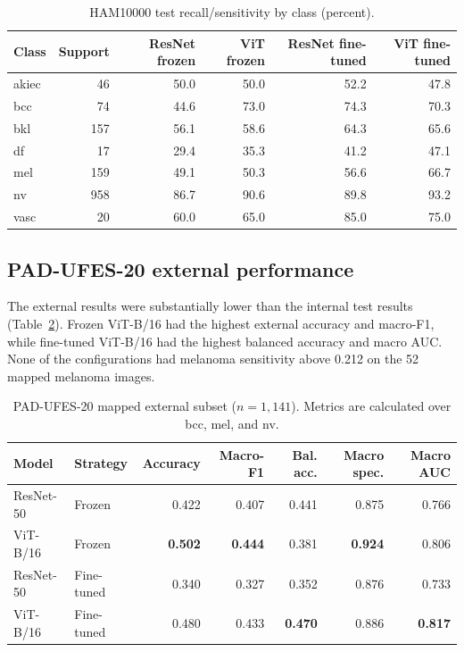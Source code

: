 \documentclass[11pt]{article}
\begin{document}
\begin{table}[H]
\centering
\small
\caption{HAM10000 test recall/sensitivity by class (percent).}
\label{tab:internal-recall}
\begin{tabular}{lrrrrr}
\toprule
Class & Support & ResNet frozen & ViT frozen & ResNet fine-tuned & ViT fine-tuned\\
\midrule
akiec & 46 & 50.0 & 50.0 & 52.2 & 47.8\\
bcc   & 74 & 44.6 & 73.0 & 74.3 & 70.3\\
bkl   & 157 & 56.1 & 58.6 & 64.3 & 65.6\\
df    & 17 & 29.4 & 35.3 & 41.2 & 47.1\\
mel   & 159 & 49.1 & 50.3 & 56.6 & 66.7\\
nv    & 958 & 86.7 & 90.6 & 89.8 & 93.2\\
vasc  & 20 & 60.0 & 65.0 & 85.0 & 75.0\\
\bottomrule
\end{tabular}
\end{table}

\subsection{PAD-UFES-20 external performance}

The external results were substantially lower than the internal test results (Table~\ref{tab:external}). Frozen ViT-B/16 had the highest external accuracy and macro-F1, while fine-tuned ViT-B/16 had the highest balanced accuracy and macro AUC. None of the configurations had melanoma sensitivity above 0.212 on the 52 mapped melanoma images.

\begin{table}[H]
\centering
\small
\caption{PAD-UFES-20 mapped external subset ($n=1,141$). Metrics are calculated over bcc, mel, and nv.}
\label{tab:external}
\begin{tabular}{llrrrrr}
\toprule
Model & Strategy & Accuracy & Macro-F1 & Bal. acc. & Macro spec. & Macro AUC\\
\midrule
ResNet-50 & Frozen & 0.422 & 0.407 & 0.441 & 0.875 & 0.766\\
ViT-B/16 & Frozen & \textbf{0.502} & \textbf{0.444} & 0.381 & \textbf{0.924} & 0.806\\
ResNet-50 & Fine-tuned & 0.340 & 0.327 & 0.352 & 0.876 & 0.733\\
ViT-B/16 & Fine-tuned & 0.480 & 0.433 & \textbf{0.470} & 0.886 & \textbf{0.817}\\
\bottomrule
\end{tabular}
\end{table}
\end{document}
